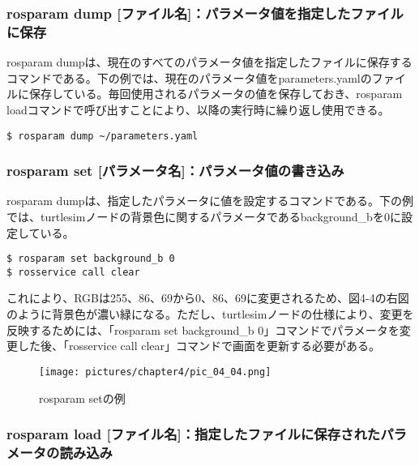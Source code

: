 \subsubsection{rosparam dump [ファイル名]：パラメータ値を指定したファイルに保存}

rosparam dumpは、現在のすべてのパラメータ値を指定したファイルに保存するコマンドである。下の例では、現在のパラメータ値をparameters.yamlのファイルに保存している。毎回使用されるパラメータの値を保存しておき、rosparam loadコマンドで呼び出すことにより、以降の実行時に繰り返し使用できる。

\begin{lstlisting}[language=ROS]
$ rosparam dump ~/parameters.yaml
\end{lstlisting}

\subsubsection{rosparam set [パラメータ名]：パラメータ値の書き込み}

rosparam dumpは、指定したパラメータに値を設定するコマンドである。下の例では、turtlesimノードの背景色に関するパラメータであるbackground\_bを0に設定している。

\begin{lstlisting}[language=ROS]
$ rosparam set background_b 0
$ rosservice call clear
\end{lstlisting}

これにより、RGBは255、86、69から0、86、69に変更されるため、図4-4の右図のように背景色が濃い緑になる。ただし、turtlesimノードの仕様により、変更を反映するためには、「rosparam set background\_b 0」コマンドでパラメータを変更した後、「rosservice call clear」コマンドで画面を更新する必要がある。

\begin{figure}[h]
  \centering
  \texttt{[image: pictures/chapter4/pic\_04\_04.png]}
  \caption{rosparam setの例}
\end{figure}

\subsubsection{rosparam load [ファイル名]：指定したファイルに保存されたパラメータの読み込み}

